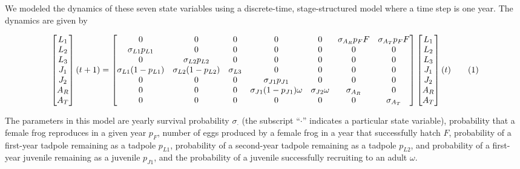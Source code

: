 \documentclass[9pt,twocolumn,twoside,lineno]{pnas-new}
\begin{document}
{We modeled the dynamics of these seven state variables using a
discrete-time, stage-structured model where a time step is one year. The
dynamics are given by

\begin{figure}\[
\begin{bmatrix}
L_1 \\
L_2 \\
L_3 \\
J_1 \\
J_2 \\
A_R \\ 
A_T
\end{bmatrix}(t + 1) = 
\begin{bmatrix}
  0 & 0 & 0 & 0 & 0 & \sigma_{A_R} p_F F & \sigma_{A_T} p_F F \\
  \sigma_{L1} p_{L1} & 0 & 0 & 0 & 0 & 0 & 0 \\
  0 & \sigma_{L2} p_{L2} & 0 & 0 & 0 & 0 & 0\\
  \sigma_{L1} (1 - p_{L1}) & \sigma_{L2} (1 - p_{L2}) & \sigma_{L3} & 0 & 0 & 0 & 0 \\
  0 & 0 & 0 & \sigma_{J1} p_{J1} & 0 & 0 & 0 \\
  0 & 0 & 0 & \sigma_{J1} (1 - p_{J1}) \omega & \sigma_{J2} \omega & \sigma_{A_R} & 0 \\
  0 & 0 & 0 & 0 & 0 & 0 & \sigma_{A_T} 
\end{bmatrix} \begin{bmatrix}
L_1 \\
L_2 \\
L_3 \\
J_1 \\
J_2 \\
A_R \\
A_T \\
\end{bmatrix}(t)\numberthis \label{eqn:matrix} 
\]\end{figure}

The parameters in this model are yearly survival probability
\(\sigma_{\cdot}\) (the subscript ``\(\cdot\)'' indicates a particular
state variable), probability that a female frog reproduces in a given
year \(p_F\), number of eggs produced by a female frog in a year that
successfully hatch \(F\), probability of a first-year tadpole remaining
as a tadpole \(p_{L1}\), probability of a second-year tadpole remaining
as a tadpole \(p_{L2}\), and probability of a first-year juvenile
remaining as a juvenile \(p_{J1}\), and the probability of a juvenile
successfully recruiting to an adult \(\omega\).

}
\end{document}

